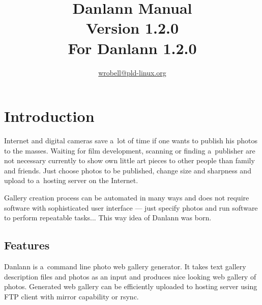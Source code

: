 \documentclass{article}
\title{Danlann Manual\\\small{Version 1.2.0\\For Danlann 1.2.0}}
\author{\url{wrobell@pld-linux.org}}
\begin{document}
\maketitle

\tableofcontents
{}

\section{Introduction}
Internet and digital cameras save a~lot of time
if one wants to publish his photos to the masses. Waiting for film
development, scanning or finding a~publisher are not necessary currently to show
own little art pieces to other people than family and friends. Just choose
photos to be published, change size and sharpness and
upload to a~hosting server on the Internet.

Gallery creation process can be automated in many ways and does not require
software with sophisticated user interface --- just specify photos and run
software to perform repeatable tasks... This way idea of Danlann was born.

\subsection{Features}
Danlann is a~command line photo web gallery generator.
It takes text gallery description files and photos as an input and produces 
nice looking web gallery of photos. Generated web gallery can be
efficiently uploaded to hosting server using FTP client with
mirror capability or rsync.
\end{document}
